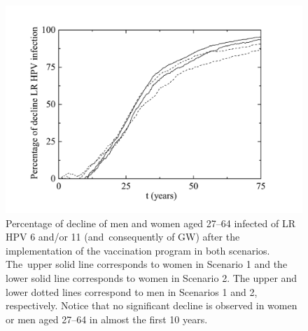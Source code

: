 \begin{figure}[H]
	\centering
	\includegraphics[scale=0.4]{PercentageDeclineolder.pdf}
	\vspace{-12pt}
	\caption{Percentage of decline of men and women aged 27--64 infected of LR HPV 6 and/or 11 (and~consequently of GW) after the implementation of the vaccination program in both scenarios. The~upper solid line corresponds to women in Scenario 1 and the lower solid line corresponds to women in Scenario 2. The upper and lower dotted lines correspond to men in Scenarios 1 and 2, respectively. Notice that no significant decline is observed in women or men aged 27--64 in almost the first 10 years.}
	\label{fig4}
\end{figure}
\vspace{-40pt}

